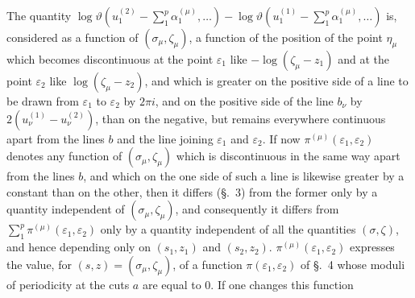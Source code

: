 \documentclass{article}
\begin{document}
The quantity $\log\vartheta\left(u_{1}^{(2)} - \displaystyle\sum_{1}^{p} \alpha_{1}^{(\mu)}, \ldots\right) - \log\vartheta\left(u_{1}^{(1)} - \displaystyle\sum_{1}^{p} \alpha_{1}^{(\mu)}, \ldots\right)$ is, considered as a function of $(\sigma_{\mu}, \zeta_{\mu})$, a function of the position of the point $\eta_{\mu}$ which becomes discontinuous at the point $\varepsilon_{1}$ like $-\log(\zeta_{\mu}-z_{1})$ and at the point $\varepsilon_{2}$ like $\log(\zeta_{\mu}-z_{2})$, and which is greater on the positive side of a line to be drawn from $\varepsilon_{1}$ to $\varepsilon_{2}$ by $2\pi i$, and on the positive side of the line $b_{\nu}$ by $2(u_{\nu}^{(1)} - u_{\nu}^{(2)})$, than on the negative, but remains everywhere continuous apart from the lines $b$ and the line joining $\varepsilon_{1}$ and $\varepsilon_{2}$. If now $\pi^{(\mu)}(\varepsilon_{1}, \varepsilon_{2})$ denotes any function of $(\sigma_{\mu}, \zeta_{\mu})$ which is discontinuous in the same way apart from the lines $b$, and which on the one side of such a line is likewise greater by a constant than on the other, then it differs (§.~3) from the former only by a quantity independent of $(\sigma_{\mu}, \zeta_{\mu})$, and consequently it differs from $\displaystyle\sum_{1}^{p} \pi^{(\mu)}(\varepsilon_{1}, \varepsilon_{2})$ only by a quantity independent of all the quantities $(\sigma, \zeta)$, and hence depending only on $(s_{1}, z_{1})$ and $(s_{2}, z_{2})$. $\pi^{(\mu)}(\varepsilon_{1}, \varepsilon_{2})$ expresses the value, for $(s, z) = (\sigma_{\mu}, \zeta_{\mu})$, of a function $\pi(\varepsilon_{1}, \varepsilon_{2})$ of §.~4 whose moduli of periodicity at the cuts $a$ are equal to 0. If one changes this function
\end{document}
